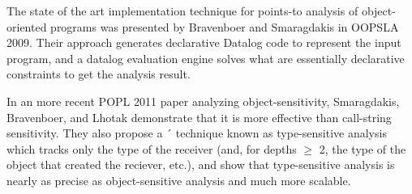 The state of the art implementation technique for points-to analysis of object-oriented programs was presented by Bravenboer and Smaragdakis in OOPSLA 2009. Their approach generates declarative Datalog code to represent the input program, and a datalog evaluation engine
solves what are essentially declarative constraints to get the analysis result.

In an more recent POPL 2011 paper analyzing object-sensitivity, Smaragdakis, Bravenboer,
and Lhotak demonstrate that it is more effective than call-string sensitivity. They also propose a ´
technique known as type-sensitive analysis which tracks only the type of the receiver (and, for
depths $\geq$ 2, the type of the object that created the reciever, etc.), and show that type-sensitive
analysis is nearly as precise as object-sensitive analysis and much more scalable.
